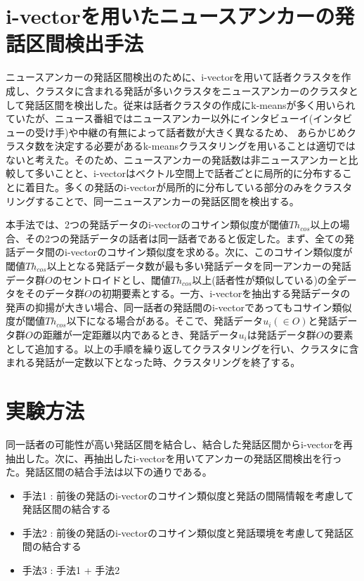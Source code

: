 \section{i-vectorを用いたニュースアンカーの発話区間検出手法\cite{nozaki_gakuseikai}}
\label{section:clustering}
ニュースアンカーの発話区間検出のために、i-vectorを用いて話者クラスタを作成し、クラスタに含まれる発話が多いクラスタをニュースアンカーのクラスタとして発話区間を検出した。従来は話者クラスタの作成にk-meansが多く用いられていたが、ニュース番組ではニュースアンカー以外にインタビューイ(インタビューの受け手)や中継の有無によって話者数が大きく異なるため、
あらかじめクラスタ数を決定する必要があるk-meansクラスタリングを用いることは適切ではないと考えた。そのため、ニュースアンカーの発話数は非ニュースアンカーと比較して多いことと、i-vectorはベクトル空間上で話者ごとに局所的に分布することに着目た。多くの発話のi-vectorが局所的に分布している部分のみをクラスタリングすることで、同一ニュースアンカーの発話区間を検出する。\par
本手法では、2つの発話データのi-vectorのコサイン類似度が閾値$Th_{cos}$以上の場合、その2つの発話データの話者は同一話者であると仮定した。まず、全ての発話データ間のi-vectorのコサイン類似度を求める。次に、このコサイン類似度が閾値$Th_{cos}$以上となる発話データ数が最も多い発話データを同一アンカーの発話データ群$O$のセントロイドとし、閾値$Th_{cos}$以上(話者性が類似している)の全データをそのデータ群$O$の初期要素とする。一方、i-vectorを抽出する発話データの発声の抑揚が大きい場合、同一話者の発話間のi-vectorであってもコサイン類似度が閾値$Th_{cos}$以下になる場合がある。そこで、発話データ$u_i(\in O)$と発話データ群$O$の距離が一定距離以内であるとき、発話データ$u_i$は発話データ群$O$の要素として追加する。以上の手順を繰り返してクラスタリングを行い、クラスタに含まれる発話が一定数以下となった時、クラスタリングを終了する。\par

\section{実験方法}
同一話者の可能性が高い発話区間を結合し、結合した発話区間からi-vectorを再抽出した。次に、再抽出したi-vectorを用いてアンカーの発話区間検出を行った。発話区間の結合手法は以下の通りである。

\begin{itemize}
\item 手法1 : 前後の発話のi-vectorのコサイン類似度と発話の間隔情報を考慮して発話区間の結合する
\item 手法2 : 前後の発話のi-vectorのコサイン類似度と発話環境を考慮して発話区間の結合する
\item 手法3 : 手法1 + 手法2
\end{itemize}

